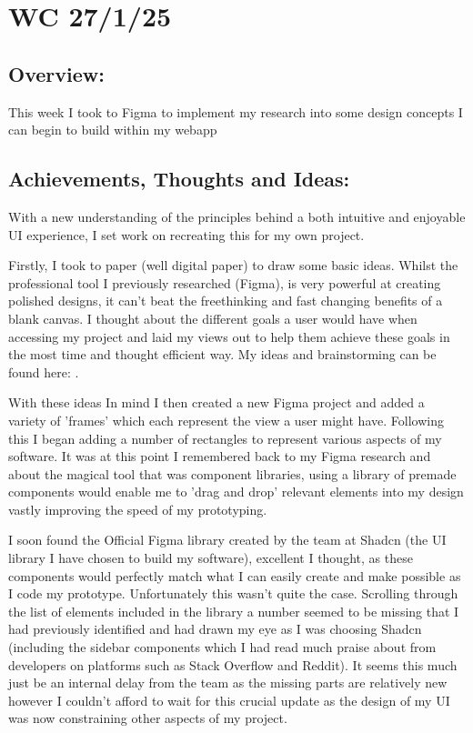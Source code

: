 \section{WC 27/1/25}

\subsection*{Overview:}
This week I took to Figma to implement my research into some design concepts I can begin to build within my webapp

\subsection*{Achievements, Thoughts and Ideas:}
With a new understanding of the principles behind a both intuitive and enjoyable UI experience, I set work on recreating this for my own project. 

Firstly, I took to paper (well digital paper) to draw some basic ideas. Whilst the professional tool I previously researched (Figma), is very powerful at creating polished designs, it can't beat the freethinking and fast changing benefits of a blank canvas. I thought about the different goals a user would have when accessing my project and laid my views out to help them achieve these goals in the most time and thought efficient way. My ideas and brainstorming can be found here: .

With these ideas In mind I then created a new Figma project and added a variety of 'frames' which each represent the view a user might have. Following this I began adding a number of rectangles to represent various aspects of my software. It was at this point I remembered back to my Figma research and about the magical tool that was component libraries, using a library of premade components would enable me to 'drag and drop' relevant elements into my design vastly improving the speed of my prototyping.

I soon found the Official Figma library created by the team at Shadcn (the UI library I have chosen to build my software), excellent I thought, as these components would perfectly match what I can easily create and make possible as I code my prototype. Unfortunately this wasn't quite the case. Scrolling through the list of elements included in the library a number seemed to be missing that I had previously identified and had drawn my eye as I was choosing Shadcn (including the sidebar components which I had read much praise about from developers on platforms such as Stack Overflow and Reddit). It seems this much just be an internal delay from the team as the missing parts are relatively new however I couldn't afford to wait for this crucial update as the design of my UI was now constraining other aspects of my project.


